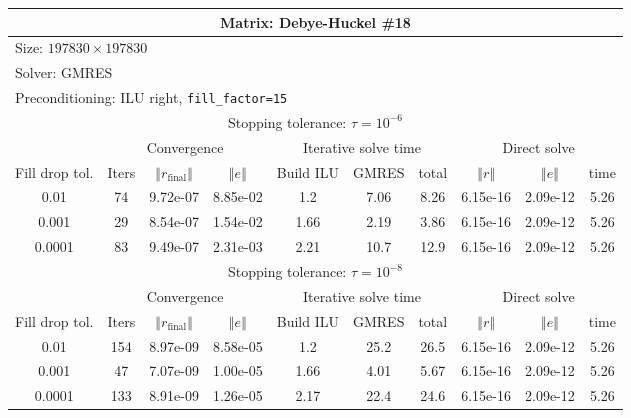 \documentclass[oneside,final]{amsart}  %
\begin{document}
\begin{tabular}{|c|c|c|c|c|c|c|c|c|c|}
\hline
\multicolumn{10}{|c|}{Matrix: Debye-Huckel \#18}\tabularnewline
\hline
  \multicolumn{10}{|l|}{Size: $197830\times197830$}\tabularnewline
\hline
\multicolumn{10}{|l|}{Solver: GMRES}\tabularnewline
\hline
\multicolumn{10}{|l|}{Preconditioning: ILU right, \texttt{fill\_factor=15}}\tabularnewline
\hline
\hline
\multicolumn{10}{|c|}{Stopping tolerance: $\tau=10^{-6}$}\tabularnewline
\hline
\hline
 & \multicolumn{3}{c|}{Convergence} & \multicolumn{3}{c|}{Iterative solve time} & \multicolumn{3}{c|}{Direct solve}\tabularnewline
\hline
Fill drop tol.  & Iters & $\left\Vert r_{\text{final}}\right\Vert $  & $\left\Vert e\right\Vert $  & Build ILU  & GMRES  & total  & $\left\Vert r\right\Vert $ & $\left\Vert e\right\Vert $  & time\tabularnewline
\hline
0.01   & 74  & 9.72e-07 & 8.85e-02 &     1.2 &    7.06 &    8.26 & 6.15e-16 & 2.09e-12 &      5.26\\
  \hline
0.001  & 29  & 8.54e-07 & 1.54e-02 &    1.66 &    2.19 &    3.86 & 6.15e-16 & 2.09e-12 &      5.26\\
  \hline
0.0001 & 83  & 9.49e-07 & 2.31e-03 &    2.21 &    10.7 &    12.9 & 6.15e-16 & 2.09e-12 &      5.26\\
  \hline
\hline
\multicolumn{10}{|c|}{Stopping tolerance: $\tau=10^{-8}$}\tabularnewline
\hline
\hline
 & \multicolumn{3}{c|}{Convergence} & \multicolumn{3}{c|}{Iterative solve time} & \multicolumn{3}{c|}{Direct solve }\tabularnewline
\hline
Fill drop tol.  & Iters  & $\left\Vert r_{\text{final}}\right\Vert $  & $\left\Vert e\right\Vert $ & Build ILU  & GMRES  & total  & $\left\Vert r\right\Vert $  & $\left\Vert e\right\Vert $  & time\tabularnewline
\hline
0.01   & 154 & 8.97e-09 & 8.58e-05 &     1.2 &    25.2 &    26.5 & 6.15e-16 & 2.09e-12 &      5.26\\
  \hline
0.001  & 47  & 7.07e-09 & 1.00e-05 &    1.66 &    4.01 &    5.67 & 6.15e-16 & 2.09e-12 &      5.26\\
  \hline
0.0001 & 133 & 8.91e-09 & 1.26e-05 &    2.17 &    22.4 &    24.6 & 6.15e-16 & 2.09e-12 &      5.26\\
  \hline
\end{tabular}
\end{document}
